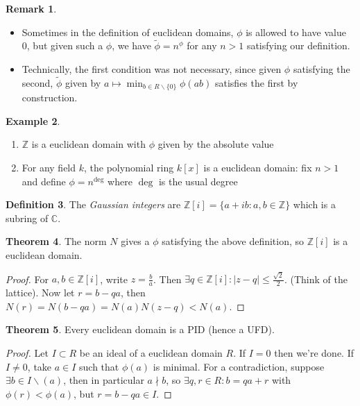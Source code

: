 \documentclass{article}
\newcommand{\Z}{\mathbb{Z}}
\newcommand{\C}{\mathbb{C}}
\theoremstyle{definition}
\newtheorem{defn}{Definition}[subsection]
\newtheorem{thm}[defn]{Theorem}
\newtheorem{example}[defn]{Example}
\newtheorem{remark}[defn]{Remark}
\begin{document}
\begin{remark}
\begin{itemize}
\item Sometimes in the definition of euclidean domains, $\phi$ is allowed to have value 0, but given such a $\phi$, we have $\widetilde\phi=n^\phi$ for any $n>1$ satisfying our definition.
\item Technically, the first condition was not necessary, since given $\phi$ satisfying the second, $\widetilde\phi$ given by $a\mapsto\min_{b\in R\backslash\{0\}}\phi(ab)$ satisfies the first by construction.
\end{itemize}
\end{remark}

\begin{example}
\begin{enumerate}
\item $\Z$ is a euclidean domain with $\phi$ given by the absolute value
\item For any field $k$, the polynomial ring $k[x]$ is a euclidean domain: fix $n>1$ and define $\phi=n^{\deg}$ where $\deg$ is the usual degree
\end{enumerate}
\end{example}

\begin{defn}
The \textit{Gaussian integers} are $\Z[i]=\{a+ib:a,b\in\Z\}$ which is a subring of $\C$.
\end{defn}

\begin{thm}
\label{thm:ZiisED}
The norm $N$ gives a $\phi$ satisfying the above definition, so $\Z[i]$ is a euclidean domain.
\end{thm}
\begin{proof}
For $a,b\in\Z[i]$, write $z=\frac{b}{a}$. Then $\exists q\in\Z[i]:|z-q|\leq\frac{\sqrt 2}{2}$. (Think of the lattice). Now let $r=b-qa$, then $N(r)=N(b-qa)=N(a)N(z-q)<N(a)$.
\end{proof}

\begin{thm}
Every euclidean domain is a PID (hence a UFD).
\end{thm}
\begin{proof}
Let $I\subset R$ be an ideal of a euclidean domain $R$. If $I=0$ then we're done. If $I\neq 0$, take $a\in I$ such that $\phi(a)$ is minimal. For a contradiction, suppose $\exists b\in I\backslash (a)$, then in particular $a\nmid b$, so $\exists q,r\in R:b=qa+r$ with $\phi(r)<\phi(a)$, but $r=b-qa\in I$.
\end{proof}
\end{document}
